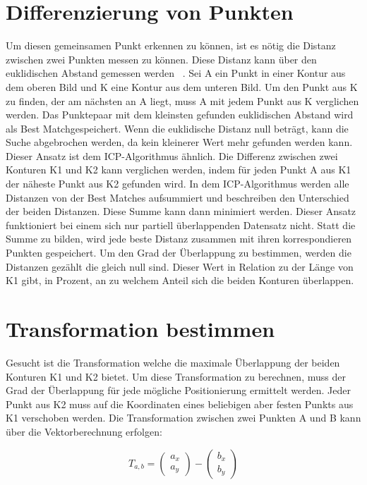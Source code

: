 \section{Differenzierung von Punkten}

Um diesen gemeinsamen Punkt erkennen zu können, ist es nötig die Distanz 
zwischen zwei Punkten messen zu können.
Diese Distanz kann über den euklidischen Abstand gemessen werden
~\cite{Dokmanic.2015}. Sei A ein Punkt in einer Kontur aus dem oberen Bild und K eine 
Kontur aus dem unteren Bild.  
Um den Punkt aus K zu finden, der am nächsten an A liegt, muss A mit jedem Punkt aus 
K verglichen werden. Das Punktepaar mit dem kleinsten gefunden euklidischen Abstand 
wird als \glq Best Match\grq gespeichert. Wenn die euklidische Distanz null beträgt, kann 
die Suche abgebrochen werden, da kein kleinerer Wert mehr gefunden werden kann.
Dieser Ansatz ist dem ICP-Algorithmus ähnlich. Die Differenz zwischen zwei Konturen 
K1 und K2 kann verglichen werden, indem für jeden Punkt A aus K1 der näheste Punkt aus 
K2 gefunden wird. In dem ICP-Algorithmus werden alle Distanzen von der \glq Best Matches \grq 
aufsummiert und beschreiben den Unterschied der beiden Distanzen. Diese Summe kann dann 
minimiert werden. Dieser Ansatz funktioniert bei einem sich nur partiell
überlappenden Datensatz nicht. 
Statt die Summe zu bilden, wird jede beste Distanz zusammen mit ihren korrespondieren 
Punkten gespeichert. Um den Grad der Überlappung zu bestimmen, werden die Distanzen 
gezählt die gleich null sind. Dieser Wert in Relation zu der Länge von K1 gibt, 
in Prozent, an zu welchem Anteil sich die beiden Konturen überlappen.

\section{Transformation bestimmen}

Gesucht ist die Transformation welche die maximale Überlappung der beiden 
Konturen K1 und K2 bietet. Um diese Transformation zu berechnen, muss der 
Grad der Überlappung für jede mögliche Positionierung ermittelt werden. Jeder
Punkt aus K2 muss auf die Koordinaten eines beliebigen aber festen Punkts aus K1 
verschoben werden.
Die Transformation zwischen zwei Punkten A und B kann über die Vektorberechnung erfolgen:

\begin{equation*}
    T_{a,b} = \begin{pmatrix}a_x\\a_y\end{pmatrix} - \begin{pmatrix}b_x\\b_y\end{pmatrix}
\end{equation*}

